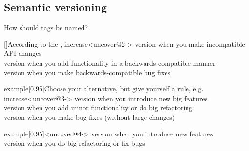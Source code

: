 \subsection{Semantic versioning}
\begin{frame}{How should tags be named? \hfill{}}
    \vspace{-2mm}
    \PrepareURLsymbol[PB]
    \begin{varblock*}{}[\textwidth]{According to the \color{PP}, increase}<uncover@2->
        \small
         version  when you make incompatible API changes\\
         version  when you add functionality in a backwards-compatible manner\\
         version  when you make backwards-compatible bug fixes
    \end{varblock*}
    \begin{varblock*}{example}[0.95\textwidth]{Choose your alternative, but give yourself a rule, e.g. increase}<uncover@3->
        \small
         version  when you introduce new big features\\
         version  when you add minor functionality or do big refactoring\\
         version  when you make bug fixes (without large changes)
    \end{varblock*}
    \vspace{-2mm}
    \begin{varblock*}{example}[0.95\textwidth]{}<uncover@4->
        \small
         version  when you introduce new features\\
         version  when you do big refactoring or fix bugs
    \end{varblock*}
    \begin{center}
    \end{center}
\end{frame}
